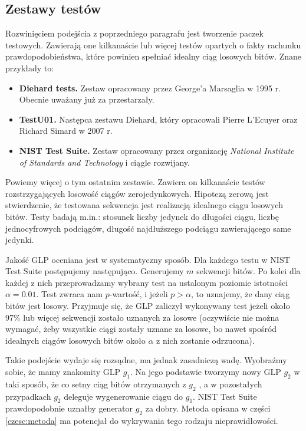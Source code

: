 \documentclass[a4paper,11pt,twoside]{book}
\theoremstyle{definition}
\begin{document}
\subsection*{Zestawy testów}
Rozwinięciem podejścia z poprzedniego paragrafu jest tworzenie paczek testowych. Zawierają one kilkanaście lub więcej testów opartych o fakty rachunku prawdopodobieństwa, które powinien spełniać idealny ciąg losowych bitów. Znane przykłady to:
\begin{itemize}
 \item \textbf{Diehard tests.} Zestaw opracowany przez George'a Marsaglia w 1995 r. Obecnie uważany już za przestarzały.
 \item \textbf{TestU01.} Następca zestawu Diehard, który opracowali Pierre L’Ecuyer oraz Richard Simard w 2007 r.
 \item \textbf{NIST Test Suite.} Zestaw opracowany przez organizację \textit{National Institute of Standards and Technology} i ciągle rozwijany. 
\end{itemize}

Powiemy więcej o tym ostatnim zestawie. Zawiera on kilkanaście testów rozstrzygających losowość ciągów zerojedynkowych. Hipotezą zerową jest stwierdzenie, że testowana sekwencja jest realizacją idealnego ciągu losowych bitów. Testy badają m.in.: stosunek liczby jedynek do długości ciągu, liczbę jednocyfrowych podciągów, długość najdłuższego podciągu zawierającego same jedynki.
 
Jakość GLP oceniana jest w systematyczny sposób. Dla każdego testu w NIST Test Suite postępujemy następująco. Generujemy $m$ sekwencji bitów. Po kolei dla każdej z nich przeprowadzamy wybrany test na ustalonym poziomie istotności $\alpha = 0.01$. Test zwraca nam $p$-wartość, i jeżeli $p > \alpha$, to uznajemy, że dany ciąg bitów jest losowy. Przyjmuje się, że GLP zaliczył wykonywany test jeżeli około 97\% lub więcej sekwencji zostało uznanych za losowe (oczywiście nie można wymagać, żeby wszystkie ciągi zostały uznane za losowe, bo nawet spośród idealnych ciągów losowych bitów około $\alpha$ z nich zostanie odrzucona).

Takie podejście wydaje się rozsądne, ma jednak zasadniczą wadę. Wyobraźmy sobie, że mamy znakomity GLP $g_1$. Na jego podstawie tworzymy nowy GLP $g_2$ w taki sposób, że co setny ciąg bitów otrzymanych z $g_2$ , a w pozostałych przypadkach $g_2$ deleguje wygenerowanie ciągu do $g_1$. NIST Test Suite prawdopodobnie uznałby generator $g_2$ za dobry. Metoda opisana w części \ref{czesc:metoda} ma potencjał do wykrywania tego rodzaju nieprawidłowości.
\end{document}
